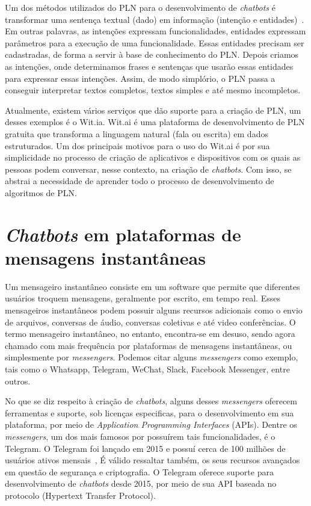 Um dos métodos utilizados do PLN para o desenvolvimento de \textit{chatbots} é transformar uma sentença textual (dado) em informação (intenção e entidades)~\cite{Anatomy}. Em outras palavras, as intenções expressam funcionalidades, entidades expressam parâmetros para a execução de uma funcionalidade. Essas entidades precisam ser cadastradas, de forma a servir à base de conhecimento do PLN. Depois criamos as intenções, onde determinamos frases e sentenças que usarão essas entidades para expressar essas intenções. Assim, de modo simplório, o PLN passa a conseguir interpretar textos completos, textos simples e até mesmo incompletos.

Atualmente, existem vários serviços que dão suporte para a criação de PLN, um desses exemplos é o Wit.ia. Wit.ai é uma plataforma de desenvolvimento de PLN gratuita que transforma a linguagem natural (fala ou escrita) em dados estruturados. Um dos principais motivos para o uso do Wit.ai é por sua simplicidade no processo de criação de aplicativos e dispositivos com os quais as pessoas podem conversar, nesse contexto, na criação de \textit{chatbots}. Com isso, se abstrai a necessidade de aprender todo o processo de desenvolvimento de algoritmos de PLN.


\section{\textit{Chatbots} em plataformas de mensagens instantâneas}\label{cap:02:sec:03:sub:chatbotsmessenger}

Um mensageiro instantâneo consiste em um software que permite que diferentes usuários troquem mensagens, geralmente por escrito, em tempo real. 
Esses mensageiros instantâneos podem possuir alguns recursos adicionais como o envio de arquivos, conversas de áudio, conversas coletivas e até video conferências.
O termo mensageiro instantâneo, no entanto, encontra-se em desuso, sendo agora chamado com mais frequência por plataformas de mensagens instantâneas, ou simplesmente por \textit{messengers}. Podemos citar alguns \textit{messengers} como exemplo, tais como o Whatsapp, Telegram, WeChat, Slack, Facebook Messenger, entre outros.

No que se diz respeito à criação de \textit{chatbots}, alguns desses \textit{messengers} oferecem ferramentas e suporte, sob licenças especificas, para o desenvolvimento em sua plataforma, por meio de \textit{Application Programming Interfaces} (APIs).
Dentre os \textit{messengers}, um dos mais famosos por possuírem tais funcionalidades, é o Telegram.
O Telegram foi lançado em 2015 e possuí cerca de 100 milhões de usuários ativos mensais~\cite{IMaster}, 
É válido ressaltar também, os seus recursos avançados em questão de segurança e criptografia.
O Telegram oferece suporte para desenvolvimento de \textit{chatbots} desde 2015, por meio de sua API baseada no protocolo  (Hypertext Transfer Protocol).

